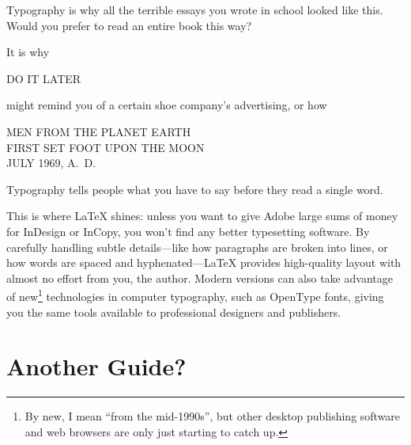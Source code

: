 \begin{adjustwidth}{2em}{0pt}
\fontsize{12pt}{24pt}\selectfont\raggedright
\noindent Typography is why all the terrible essays you wrote in school
looked like this.
Would you prefer to read an entire book this way?
\end{adjustwidth}
\bigskip

\noindent It is why

\bigskip
\begin{adjustwidth}{2em}{0pt}
\noindent{}\Large DO IT LATER
\end{adjustwidth}
\bigskip

\noindent might remind you of a certain shoe company's advertising,
or how

\begin{center}
\noindent MEN FROM THE PLANET EARTH \\
FIRST SET FOOT UPON THE MOON \\
JULY 1969, A.~D.
\end{center}

\noindent Typography tells people
what you have to say before they read a single word.

This is where \LaTeX{} shines: unless you want to give Adobe large sums
of money for InDesign or InCopy,
you won't find any better typesetting software.
By carefully handling subtle details---like how paragraphs are broken into lines,
or how words are spaced and hyphenated---\LaTeX{} provides high-quality layout
with almost no effort from you, the author.
Modern versions can also take advantage of new\footnote{By new,
I mean ``from the mid-1990s''\quotekern, but other desktop publishing software and web
browsers are only just starting to catch up.} technologies in computer typography,
such as OpenType fonts, giving you the same tools available to professional
designers and publishers.

\chapter{Another Guide?}
